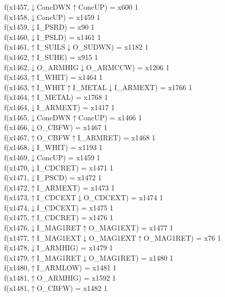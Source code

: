 f(x1457,$\downarrow$ConcDWN$\uparrow$ConcUP) = x600 {1} \\
f(x1458,$\downarrow$ConcUP) = x1459 {1} \\
f(x1459,$\downarrow$I\_PSRD) = x90 {1} \\
f(x1460,$\downarrow$I\_PSLD) = x1461 {1} \\
f(x1461,$\uparrow$I\_SUILS$\downarrow$O\_SUDWN) = x1182 {1} \\
f(x1462,$\uparrow$I\_SUHE) = x915 {1} \\
f(x1462,$\downarrow$O\_ARMHIG$\downarrow$O\_ARMCCW) = x1206 {1} \\
f(x1463,$\uparrow$I\_WHIT) = x1464 {1} \\
f(x1463,$\uparrow$I\_WHIT$\uparrow$I\_METAL$\downarrow$I\_ARMEXT) = x1766 {1} \\
f(x1464,$\uparrow$I\_METAL) = x1768 {1} \\
f(x1464,$\downarrow$I\_ARMEXT) = x1417 {1} \\
f(x1465,$\downarrow$ConcDWN$\uparrow$ConcUP) = x1466 {1} \\
f(x1466,$\downarrow$O\_CBFW) = x1467 {1} \\
f(x1467,$\uparrow$O\_CBFW$\uparrow$I\_ARMRET) = x1468 {1} \\
f(x1468,$\downarrow$I\_WHIT) = x1193 {1} \\
f(x1469,$\downarrow$ConcUP) = x1459 {1} \\
f(x1470,$\downarrow$I\_CDCRET) = x1471 {1} \\
f(x1471,$\downarrow$I\_PSCD) = x1472 {1} \\
f(x1472,$\uparrow$I\_ARMEXT) = x1473 {1} \\
f(x1473,$\uparrow$I\_CDCEXT$\downarrow$O\_CDCEXT) = x1474 {1} \\
f(x1474,$\downarrow$I\_CDCEXT) = x1475 {1} \\
f(x1475,$\uparrow$I\_CDCRET) = x1476 {1} \\
f(x1476,$\downarrow$I\_MAG1RET$\uparrow$O\_MAG1EXT) = x1477 {1} \\
f(x1477,$\uparrow$I\_MAG1EXT$\downarrow$O\_MAG1EXT$\uparrow$O\_MAG1RET) = x76 {1} \\
f(x1478,$\downarrow$I\_ARMHIG) = x1479 {1} \\
f(x1479,$\uparrow$I\_MAG1RET$\downarrow$O\_MAG1RET) = x1480 {1} \\
f(x1480,$\uparrow$I\_ARMLOW) = x1481 {1} \\
f(x1481,$\uparrow$O\_ARMHIG) = x1592 {1} \\
f(x1481,$\uparrow$O\_CBFW) = x1482 {1} \\
